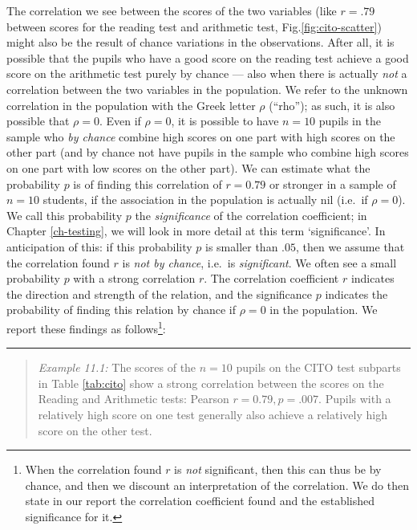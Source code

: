\documentclass[
]{book}
\begin{document}
The correlation we see between the scores of the two variables (like
\(r=.79\) between scores for the reading test and arithmetic test,
Fig.\ref{fig:cito-scatter}) might also be the result of
chance variations in the observations. After all, it is possible that
the pupils who have a good score on the reading test achieve
a good score on the arithmetic test purely by chance --- also when there is
actually \emph{not} a correlation between the two variables in the population. We
refer to the unknown correlation in the population with the Greek letter
\(\rho\) (``rho''); as such, it is also possible that \(\rho=0\). Even if \(\rho=0\),
it is possible to have \(n=10\) pupils in the sample who \emph{by chance} combine
high scores on one part with high scores on the other part (and by chance not
have pupils in the sample who combine high scores on one part with low scores
on the other part). We can estimate what the probability \(p\) is
of finding this correlation of \(r=0.79\) or stronger in a sample of
\(n=10\) students, if the association in the population is actually
nil (i.e.~if \(\rho=0\)). We call this probability \(p\) the
\emph{significance} of the correlation coefficient; in Chapter \ref{ch-testing},
we will look in more detail at this term `significance'.
In anticipation of this: if this probability \(p\) is smaller than
\(.05\), then we assume that the correlation found \(r\) is \emph{not by chance},
i.e.~is \emph{significant}. We often see a small probability \(p\) with a strong
correlation \(r\). The correlation coefficient \(r\) indicates the direction
and strength of the relation, and the significance \(p\) indicates the probability
of finding this relation by chance if \(\rho=0\) in the population. We report
these findings as follows\footnote{When the correlation found \(r\) is \emph{not} significant, then this can thus be by chance,
  and then we discount an interpretation of the correlation. We do then state in our report
  the correlation coefficient found and the established significance for it.}:

\begin{center}\rule{0.5\linewidth}{0.5pt}\end{center}

\begin{quote}
\emph{Example 11.1:}
The scores of the \(n=10\) pupils on the CITO test subparts in
Table \ref{tab:cito} show a strong correlation between the scores
on the Reading and Arithmetic tests: Pearson \(r=0.79, p=.007\). Pupils
with a relatively high score on one test generally also achieve
a relatively high score on the other test.
\end{quote}
\end{document}

